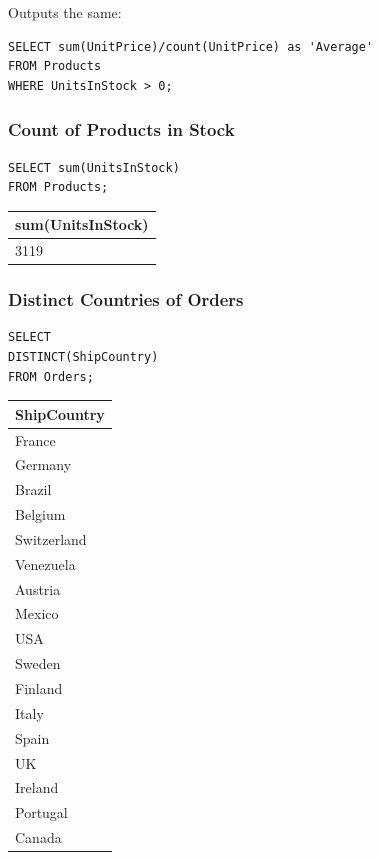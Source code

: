 \documentclass[10pt]{article}
\begin{document}
\noindent Outputs the same:

\begin{verbatim}
SELECT sum(UnitPrice)/count(UnitPrice) as 'Average'
FROM Products
WHERE UnitsInStock > 0;
\end{verbatim}


\subsubsection{Count of Products in Stock}

\begin{verbatim}
SELECT sum(UnitsInStock)
FROM Products;
\end{verbatim}


\begin{table}[H]
\begin{tabular}{|l|}
\hline
sum(UnitsInStock) \\
\hline
3119 \\
\hline
\end{tabular}
\end{table}


\subsubsection{Distinct Countries of Orders}
\begin{verbatim}
SELECT 
DISTINCT(ShipCountry)
FROM Orders;
\end{verbatim}

\begin{table}[H]
\begin{tabular}{|l|}
\hline
ShipCountry \\
\hline
France \\
Germany \\
Brazil \\
Belgium \\
Switzerland \\
Venezuela \\
Austria \\
Mexico \\
USA \\
Sweden \\
Finland \\
Italy \\
Spain \\
UK \\
Ireland \\
Portugal \\
Canada \\
\hline
\end{tabular}
\end{table}
\end{document}
